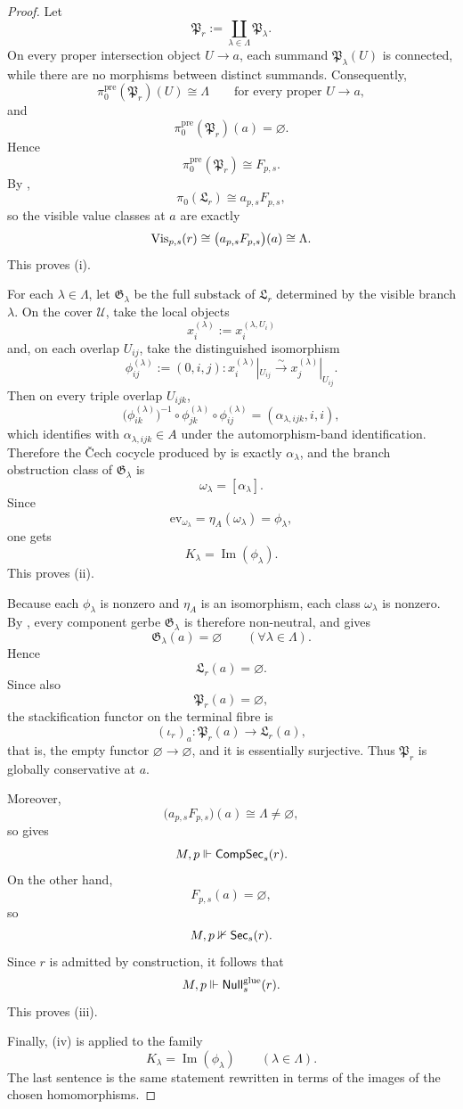 \begin{proof}
Let
\[
\mathfrak P_r:=\coprod_{\lambda\in\Lambda}\mathfrak P_\lambda.
\]
On every proper intersection object $U\to a$, each summand $\mathfrak P_\lambda(U)$ is connected, while there are no morphisms between distinct summands. Consequently,
\[
\pi_0^{\mathrm{pre}}(\mathfrak P_r)(U)\cong \Lambda
\qquad
\text{for every proper }U\to a,
\]
and
\[
\pi_0^{\mathrm{pre}}(\mathfrak P_r)(a)=\varnothing.
\]
Hence
\[
\pi_0^{\mathrm{pre}}(\mathfrak P_r)\cong F_{p,s}.
\]
By ,
\[
\pi_0(\mathfrak L_r)\cong a_{p,s}F_{p,s},
\]
so the visible value classes at $a$ are exactly
\[
\mathrm{Vis}_{p,s}(r)\cong \bigl(a_{p,s}F_{p,s}\bigr)(a)\cong \Lambda.
\]
This proves \textup{(i)}.

For each $\lambda\in\Lambda$, let $\mathfrak G_\lambda$ be the full substack of $\mathfrak L_r$ determined by the visible branch $\lambda$. On the cover $\mathcal U$, take the local objects
\[
x_i^{(\lambda)}:=x_i^{(\lambda,U_i)}
\]
and, on each overlap $U_{ij}$, take the distinguished isomorphism
\[
\phi_{ij}^{(\lambda)}:=(0,i,j):x_i^{(\lambda)}|_{U_{ij}}\xrightarrow{\sim}x_j^{(\lambda)}|_{U_{ij}}.
\]
Then on every triple overlap $U_{ijk}$,
\[
\bigl(\phi_{ik}^{(\lambda)}\bigr)^{-1}\circ
\phi_{jk}^{(\lambda)}\circ
\phi_{ij}^{(\lambda)}
=
(\alpha_{\lambda,ijk},i,i),
\]
which identifies with $\alpha_{\lambda,ijk}\in A$ under the automorphism-band identification. Therefore the \v{C}ech cocycle produced by  is exactly $\alpha_\lambda$, and the branch obstruction class of $\mathfrak G_\lambda$ is
\[
\omega_\lambda=[\alpha_\lambda].
\]
Since
\[
\mathrm{ev}_{\omega_\lambda}=\eta_A(\omega_\lambda)=\phi_\lambda,
\]
one gets
\[
K_\lambda=\operatorname{Im}(\phi_\lambda).
\]
This proves \textup{(ii)}.

Because each $\phi_\lambda$ is nonzero and $\eta_A$ is an isomorphism, each class $\omega_\lambda$ is nonzero. By , every component gerbe $\mathfrak G_\lambda$ is therefore non-neutral, and  gives
\[
\mathfrak G_\lambda(a)=\varnothing
\qquad
(\forall \lambda\in\Lambda).
\]
Hence
\[
\mathfrak L_r(a)=\varnothing.
\]
Since also
\[
\mathfrak P_r(a)=\varnothing,
\]
the stackification functor on the terminal fibre is
\[
(\iota_r)_a:\mathfrak P_r(a)\to \mathfrak L_r(a),
\]
that is, the empty functor $\varnothing\to\varnothing$, and it is essentially surjective. Thus $\mathfrak P_r$ is globally conservative at $a$.

Moreover,
\[
\bigl(a_{p,s}F_{p,s}\bigr)(a)\cong \Lambda\neq\varnothing,
\]
so  gives
\[
M,p\Vdash \mathsf{CompSec}_s(r).
\]
On the other hand,
\[
F_{p,s}(a)=\varnothing,
\]
so
\[
M,p\nVdash \mathsf{Sec}_s(r).
\]
Since $r$ is admitted by construction, it follows that
\[
M,p\Vdash \mathsf{Null}^{\mathrm{glue}}_s(r).
\]
This proves \textup{(iii)}.

Finally, \textup{(iv)} is  applied to the family
\[
K_\lambda=\operatorname{Im}(\phi_\lambda)
\qquad
(\lambda\in\Lambda).
\]
The last sentence is the same statement rewritten in terms of the images of the chosen homomorphisms.
\end{proof}

